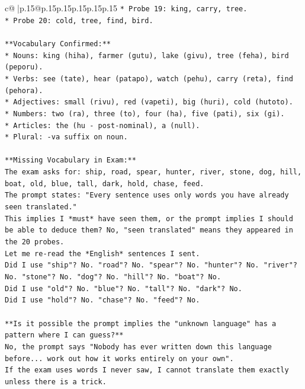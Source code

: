 \documentclass{article}
\begin{document}
{\begin{supertabular}{c@{$\;$}|p{.15\linewidth}@{}p{.15\linewidth}p{.15\linewidth}p{.15\linewidth}p{.15\linewidth}p{.15\linewidth}}
{{{\texttt{*   Probe 19: king, carry, tree.} \\
\texttt{*   Probe 20: cold, tree, find, bird.} \\
\\ 
\texttt{**Vocabulary Confirmed:**} \\
\texttt{*   Nouns: king (hiha), farmer (gutu), lake (givu), tree (feha), bird (peporu).} \\
\texttt{*   Verbs: see (tate), hear (patapo), watch (pehu), carry (reta), find (pehora).} \\
\texttt{*   Adjectives: small (rivu), red (vapeti), big (huri), cold (hutoto).} \\
\texttt{*   Numbers: two (ra), three (to), four (ha), five (pati), six (gi).} \\
\texttt{*   Articles: the (hu {-} post{-}nominal), a (null).} \\
\texttt{*   Plural: {-}va suffix on noun.} \\
\\ 
\texttt{**Missing Vocabulary in Exam:**} \\
\texttt{The exam asks for: ship, road, spear, hunter, river, stone, dog, hill, boat, old, blue, tall, dark, hold, chase, feed.} \\
\texttt{The prompt states: "Every sentence uses only words you have already seen translated."} \\
\texttt{This implies I *must* have seen them, or the prompt implies I should be able to deduce them? No, "seen translated" means they appeared in the 20 probes.} \\
\texttt{Let me re{-}read the *English* sentences I sent.} \\
\texttt{Did I use "ship"? No. "road"? No. "spear"? No. "hunter"? No. "river"? No. "stone"? No. "dog"? No. "hill"? No. "boat"? No.} \\
\texttt{Did I use "old"? No. "blue"? No. "tall"? No. "dark"? No.} \\
\texttt{Did I use "hold"? No. "chase"? No. "feed"? No.} \\
\\ 
\texttt{**Is it possible the prompt implies the "unknown language" has a pattern where I can guess?**} \\
\texttt{No, the prompt says "Nobody has ever written down this language before... work out how it works entirely on your own".} \\
\texttt{If the exam uses words I never saw, I cannot translate them exactly unless there is a trick.} \\
}}}
\end{supertabular}}
\end{document}
